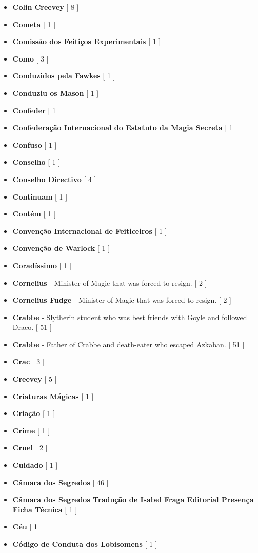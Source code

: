 \documentclass[a4paper]{article}
\begin{document}
{\begin{itemize}
	\item \textbf{Colin Creevey} [ 8 ]
	\item \textbf{Cometa} [ 1 ]
	\item \textbf{Comissão dos Feitiços Experimentais} [ 1 ]
	\item \textbf{Como} [ 3 ]
	\item \textbf{Conduzidos pela Fawkes} [ 1 ]
	\item \textbf{Conduziu os Mason} [ 1 ]
	\item \textbf{Confeder} [ 1 ]
	\item \textbf{Confederação Internacional do Estatuto da Magia Secreta} [ 1 ]
	\item \textbf{Confuso} [ 1 ]
	\item \textbf{Conselho} [ 1 ]
	\item \textbf{Conselho Directivo} [ 4 ]
	\item \textbf{Continuam} [ 1 ]
	\item \textbf{Contém} [ 1 ]
	\item \textbf{Convenção Internacional de Feiticeiros} [ 1 ]
	\item \textbf{Convenção de Warlock} [ 1 ]
	\item \textbf{Coradíssimo} [ 1 ]
	\item \textbf{Cornelius} - Minister of Magic that was forced to resign. [ 2 ]
	\item \textbf{Cornelius Fudge} - Minister of Magic that was forced to resign. [ 2 ]
	\item \textbf{Crabbe} - Slytherin student who was best friends with Goyle and followed Draco. [ 51 ]
	\item \textbf{Crabbe} - Father of Crabbe and death-eater who escaped Azkaban. [ 51 ]
	\item \textbf{Crac} [ 3 ]
	\item \textbf{Creevey} [ 5 ]
	\item \textbf{Criaturas Mágicas} [ 1 ]
	\item \textbf{Criação} [ 1 ]
	\item \textbf{Crime} [ 1 ]
	\item \textbf{Cruel} [ 2 ]
	\item \textbf{Cuidado} [ 1 ]
	\item \textbf{Câmara dos Segredos} [ 46 ]
	\item \textbf{Câmara dos Segredos Tradução de Isabel Fraga Editorial Presença Ficha Técnica} [ 1 ]
	\item \textbf{Céu} [ 1 ]
	\item \textbf{Código de Conduta dos Lobisomens} [ 1 ]

\end{itemize}}
\end{document}
